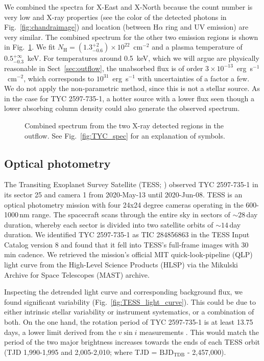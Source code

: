 \documentclass[]{aastex631}
\begin{document}
We combined the spectra for X-East and X-North because the count number is very low and X-ray properties (see the color of the detected photons in Fig.~\ref{fig:chandraimage}) and location (between H$\alpha$ ring and UV emission) are very similar.
The combined spectrum for the other two emission regions is shown in Fig.~\ref{fig:combined}. We fit $N_\mathrm{H}=(1.3_{-0.6}^{+2})\times10^{22}$~cm$^{-2}$ and a plasma temperature of $0.5_{-0.3}^{+\infty}$~keV. For temperatures around 0.5~keV, which we will argue are physically reasonable in Sect~\ref{sec:outflow}, the unabsorbed flux is of order $3 \times 10^{-13}$~erg~s$^{-1}$~cm$^{-2}$, which corresponds to $10^{31}$~erg~s$^{-1}$ with uncertainties of a factor a few. We do not apply the non-parametric method, since this is not a stellar source. As in the case for TYC 2597-735-1, a hotter source with a lower flux seen though a lower absorbing column density could also generate the observed spectrum.
\begin{figure}
    \caption{Combined spectrum from the two X-ray detected regions in the outflow. See Fig.~\ref{fig:TYC_spec} for an explanation of symbols.
    \label{fig:combined}}
\end{figure}


\subsection{Optical photometry}
The Transiting Exoplanet Survey Satellite (TESS; \citealt{Ricker2015}) observed TYC 2597-735-1 in its sector 25 and camera 1 from 2020-May-13 until 2020-Jun-08.
TESS is an optical photometry mission with four 24x24 degree cameras operating in the 600-1000\,nm range. The spacecraft scans through the entire sky in sectors of $\sim28$\,day duration, whereby each sector is divided into two satellite orbits of $\sim14$\,day duration.
We identified TYC 2597-735-1 as TIC 284856863 in the TESS Input Catalog version 8 \citep{Stassun2019} and found that it fell into TESS's full-frame images with 30 min cadence.
We retrieved the mission's official MIT quick-look-pipeline (QLP) light curve from the High-Level Science Products (HLSP) via the Mikulski Archive for Space Telescopes (MAST) archive.

Inspecting the detrended light curve and corresponding background flux, we found significant variability (Fig.~\ref{fig:TESS_light_curve}).
This could be due to either intrinsic stellar variability or instrument systematics, or a combination of both.
On the one hand, the rotation period of TYC 2597-735-1 is at least 13.75 days, a lower limit derived from the $v \sin{i}$ measurements \cite{???}. This would match the period of the two major brightness increases towards the ends of each TESS orbit (TJD 1,990-1,995 and 2,005-2,010; where TJD = $\mathrm{BJD_{TDB}}$ - 2,457,000).
\end{document}
